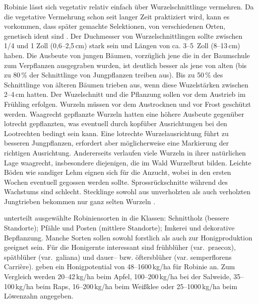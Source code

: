 \documentclass[twocolumn]{scrartcl}
\begin{document}
Robinie lässt sich vegetativ relativ einfach über Wurzelschnittlinge
vermehren. Da die vegetative Vermehrung schon seit langer Zeit
praktiziert wird, kann es vorkommen, dass später gemachte Selektionen,
von verschiedenen Orten, genetisch ident sind
\citep{liesebach2012robinie}. Der Duchmesser von Wurzelschnittlingen sollte zwischen 1/4
und 1 Zoll (0,6--2,5\,cm) stark sein und Längen von ca. 3--5~Zoll
(8--13\,cm) haben. Die Ausbeute von jungen Bäumen, vorzüglich jene die
in der Baumschule zum Verpflanzen ausgegraben wurden, ist deutlich
besser als jene von alten (bis zu 80\,\% der Schnittlinge von Jungpflanzen treiben aus).
Bis zu 50\,\% des Schnittlinge von älteren Bäumen trieben aus, wenn diese
Wuzelstärken zwischen 2--4\,cm hatten.
Der Wuzelschnitt und die Pflanzung sollen vor dem
Austrieb im Frühling erfolgen. Wurzeln müssen vor dem Austrocknen und
vor Frost geschützt werden. Waagrecht gepflanzte Wurzeln hatten eine
höhere Ausbeute gegenüber lotrecht gepflanzten, was eventuell durch
kopfüber Ausrichtungen bei den Lootrechten bedingt sein kann. Eine
lotrechte Wurzelausrichtung führt zu besseren Jungpflanzen, erfordert
aber möglicherweise eine Markierung der richtigen
Ausrichtung. Andererseits verlaufen viele Wurzeln in ihrer natürlichen
Lage waagrecht, insbesondere diejenigen, die im Wald Wurzelbrut bilden.
Leichte Böden wie sandiger Lehm
eignen sich für die Anzucht, wobei in den ersten Wochen eventuell
gegossen werden sollte. Sprossrückschnitte während des Wachstums sind
schlecht. Stecklinge sowohl aus unverholzten als auch verholzten
Jungtrieben bekommen nur ganz selten Wurzeln
\citep{swingle1937robinie}.

\cite{keresztesi1983robinie} unterteilt ausgewählte Robiniensorten in
die Klassen: Schnittholz (bessere Standorte); Pfähle und Posten
(mittlere Standorte); Imkerei und dekorative Bepflanzung. Manche
Sorten sollen sowohl forstlich als auch zur Honigproduktion geeignet
sein. Für die Honigernte interessant sind frühblüher (var.\ praecox),
spätblüher (var.\ galiana) und dauer-- bzw. öftersblüher
(var. semperflorens Carrière). \citet[S.~80]{crane1985honig} geben ein
Honigpotential von 48--1600\,kg/ha für Robinie an. Zum Vergleich werden
20--42\,kg/ha beim Apfel, 100--200\,kg/ha bei der Salweide,
35--100\,kg/ha beim Raps, 16--200\,kg/ha beim Weißklee oder
25--1000\,kg/ha beim Löwenzahn angegeben.
\end{document}
